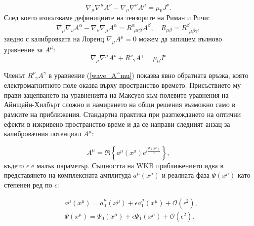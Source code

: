 \begin{equation}
	\nabla_\mu \nabla^\mu A^\nu - \nabla_\mu \nabla^\nu A^\mu = \mu_0 J^\nu.
\end{equation}
След което използваме дефинициите на тензорите на Риман и Ричи:
\begin{equation}
	\nabla_\mu \nabla_\nu A^\alpha - \nabla_\nu \nabla_\mu A^\alpha = R^\alpha_{\,\,\,\mu\nu\beta} A^\beta, \quad R_{\mu\beta} = R^\beta_{\,\,\,\mu\beta\gamma},
\end{equation} 
заедно с калибровката на Лоренц $\nabla_{\mu} A^\mu = 0$ можем да запишем вълново уравнение за $A^\mu$:
\begin{equation}\label{wave_A^mu}
	\nabla_{\mu}\nabla^\mu A^\nu + R^\nu_{\,\,\,\gamma} A^\gamma = \mu_0 J^\nu
\end{equation}

Членът $R^\nu_{\,\,\,\gamma} A^\gamma$ в уравнение (\ref{wave_A^mu}) показва явно обратната връзка, която електромагнитното поле оказва върху пространство времето. Присъствието му прави зацепването на уравненията на Максуел към полевите уравнения на Айнщайн-Хилбърт сложно и намирането на общи решения възможно само в рамките на приближения. Стандартна практика при разглеждането на оптични ефекти в изкривено пространство-време и да се направи следният анзац за калибровачния потенциал $A^\mu$:

\begin{equation}\label{A^mu_anzatz}
	A^\mu = \Re\left\{a^\mu(x^\mu)e^{i\frac{\Psi(x^\mu)}{\epsilon}}\right\},
\end{equation}
където $\epsilon$ e малък параметър. Същността на WKB приближението идва в представянето на комплексната амплитуда $a^\mu(x^\mu)$ и реалната фаза $\Psi(x^\mu)$ като степенен ред по $\epsilon$:

\begin{subequations}
	\begin{align}
		&a^\mu(x^\mu) = a_0^\mu(x^\mu) + \epsilon a_1^\mu(x^\mu) + \mathcal{O}(\epsilon^2),\\
		&\Psi(x^\mu) = \Psi_0(x^\mu) + \epsilon \Psi_1(x^\mu) + \mathcal{O}(\epsilon^2).
	\end{align}
\end{subequations}

